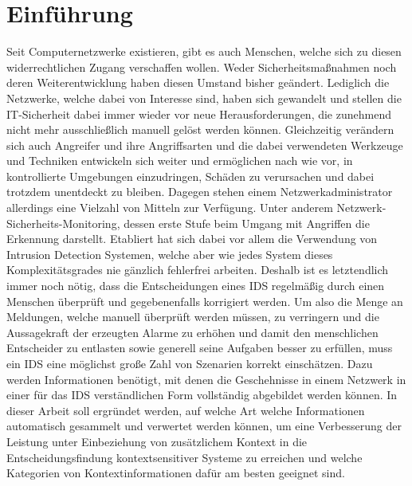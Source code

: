 \chapter{Einführung}
\label{cha:introduction}


Seit Computernetzwerke existieren, gibt es auch Menschen, welche sich zu diesen widerrechtlichen Zugang verschaffen wollen. Weder Sicherheitsmaßnahmen noch deren Weiterentwicklung haben diesen Umstand bisher geändert. Lediglich die Netzwerke, welche dabei von Interesse sind, haben sich gewandelt und stellen die IT-Sicherheit dabei immer wieder vor neue Herausforderungen, die zunehmend nicht mehr ausschließlich manuell gelöst werden können. Gleichzeitig verändern sich auch Angreifer und ihre Angriffsarten und die dabei verwendeten Werkzeuge und Techniken entwickeln sich weiter und ermöglichen nach wie vor, in kontrollierte Umgebungen einzudringen, Schäden zu verursachen und dabei trotzdem unentdeckt zu bleiben. Dagegen stehen einem Netzwerkadministrator allerdings eine Vielzahl von Mitteln zur Verfügung. Unter anderem Netzwerk-Sicherheits-Monitoring, dessen erste Stufe beim Umgang mit Angriffen die Erkennung darstellt. Etabliert hat sich dabei vor allem die Verwendung von Intrusion Detection Systemen, welche aber wie jedes System dieses Komplexitätsgrades nie gänzlich fehlerfrei arbeiten. Deshalb ist es letztendlich immer noch nötig, dass die Entscheidungen eines IDS regelmäßig durch einen Menschen überprüft und gegebenenfalls korrigiert werden. Um also die Menge an Meldungen, welche manuell überprüft werden müssen, zu verringern und die Aussagekraft der erzeugten Alarme zu erhöhen und damit den menschlichen Entscheider zu entlasten sowie generell seine Aufgaben besser zu erfüllen, muss ein IDS eine möglichst große Zahl von Szenarien korrekt einschätzen. Dazu werden Informationen benötigt, mit denen die Geschehnisse in einem Netzwerk in einer für das IDS verständlichen Form vollständig abgebildet werden können. In dieser Arbeit soll ergründet werden, auf welche Art welche Informationen automatisch gesammelt 
und verwertet werden können, um eine Verbesserung der Leistung unter Einbeziehung von zusätzlichem Kontext in die Entscheidungsfindung kontextsensitiver Systeme zu erreichen und welche Kategorien von Kontextinformationen dafür am besten geeignet sind.